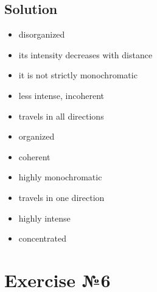 \subsection*{Solution}
\begin{itemize}
      \item disorganized
      \item its intensity decreases with distance
      \item it is not strictly monochromatic
      \item less intense, incoherent
      \item travels in all directions
\end{itemize}

\begin{itemize}
      \item organized
      \item coherent
      \item highly monochromatic
      \item travels in one direction
      \item highly intense
      \item concentrated
\end{itemize}

\section{Exercise №6}
\allocation{[Устно]}

